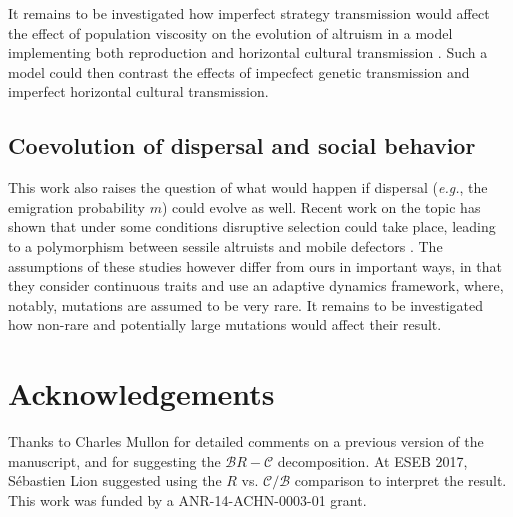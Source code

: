 \documentclass[11pt, letterpaper]{article}
\newcommand{\eg}{\textit{e.g.}}
\begin{document}
It remains to be investigated how imperfect strategy transmission would affect the effect of population viscosity on the evolution of altruism in a model implementing both reproduction and horizontal cultural transmission \citep[as in][]{Lehmann2008}. Such a model could then contrast the effects of impecfect genetic transmission and imperfect horizontal cultural transmission. 



\subsection*{Coevolution of dispersal and social behavior}
This work also raises the question of what would happen if dispersal (\eg, the emigration probability $m$) could evolve as well. Recent work on the topic has shown that under some conditions disruptive selection could take place, leading to a polymorphism between sessile altruists and mobile defectors \citep{Parvinen2013, MullonKL2017bioRxiv}. The assumptions of these studies however  differ from ours in important ways, in that they consider continuous traits and use an adaptive dynamics framework, where, notably, mutations are assumed to be very rare. It remains to be investigated how non-rare and potentially large mutations would affect their result. 

\section*{Acknowledgements}
Thanks to Charles Mullon for detailed comments on a previous version of the manuscript, and for suggesting the $\mathcal{B} R - \mathcal{C}$ decomposition. At ESEB 2017, S\'ebastien Lion suggested using the $R$ vs. $\mathcal{C}/\mathcal{B}$ comparison to interpret the result. This work was funded by a ANR-14-ACHN-0003-01 grant. 

\singlespacing
\clearpage


\doublespacing

\processdelayedfloats

\makeatletter
\efloat@restorefloats
\makeatother


\clearpage


\appendix
 
\renewcommand{\theequation}{\thesection.\arabic{equation}}
\setcounter{equation}{0}  %
 
\end{document}
